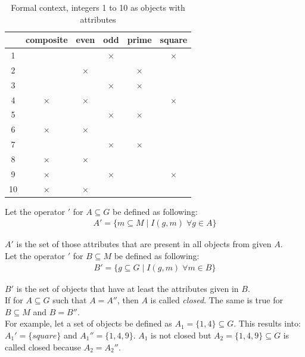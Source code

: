 \documentclass[11pt]{report}
\begin{document}
\begin{table}[h]
\caption{Formal context, integers 1 to 10 as objects with attributes}
\label{table:example}
\centering

\def\arraystretch{1.2}%
\begin{tabular}{ | c | c c c c c |}
\hline
  & composite & even & odd & prime & square\\
\hline

1 & & & $\times$ & &$\times$\\ 
2 & & $\times$ & & $\times$ &\\
3 & & & $\times$ & $\times$ &\\ 
4 & $\times$ & $\times$ & & & $\times$\\
5 & & & $\times$ & $\times$ &\\
6 & $\times$ & $\times$ & & &\\
7 & & & $\times$ & $\times$ &\\ 
8 & $\times$ & $\times$ & & &\\
9 & $\times$ & & $\times$ & & $\times$\\
10 & $\times$ & $\times$ & & &\\ \hline


\end{tabular}
\end{table}

Let the operator $'$ for $A \subseteq G$ be defined as following:
\begin{align*}
	A' = \{ m \subseteq M\; |\;  I(g, m)\;   \forall g \in A\}
\end{align*}

$A'$ is the set of those attributes that are present in all objects from given $A$. \\

Let the operator $'$ for $B \subseteq M$ be defined as following:
\begin{align*}
	B' = \{ g \subseteq G\; |\;  I(g, m)\;   \forall m \in B\}
\end{align*}

$B'$ is the set of objects that have at least the attributes given in $B$. \\

If for $A \subseteq G$ such that $A = A''$, then $A$ is called \textit{closed}. The same is true for $B \subseteq M$ and $B = B''$. \\

For example, let a set of objects be defined as $A_1 = \{1,4\} \subseteq G$. This results into: $A_1' = \{square\}$ and $A_1'' = \{1,4,9\}$. $A_1$ is not closed but $A_2 = \{1,4,9\} \subseteq G$ is called closed because $A_2 = A_2''$. \\   
\end{document}
